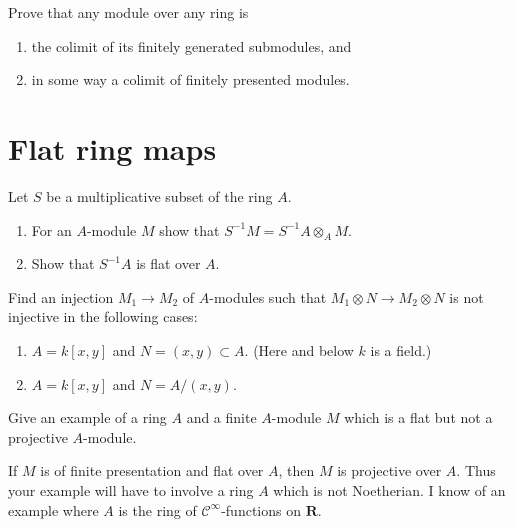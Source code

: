 \begin{exercise}
\label{exercise-colimit-modules}
Prove that any module over any ring is
\begin{enumerate}
\item the colimit of its finitely generated submodules, and
\item in some way a colimit of finitely presented modules.
\end{enumerate}
\end{exercise}








\section{Flat ring maps}
\label{section-flat}

\begin{exercise}
\label{exercise-localization-flat}
Let $S$ be a multiplicative subset of the ring $A$.
\begin{enumerate}
\item For an $A$-module $M$ show that $S^{-1}M = S^{-1}A\otimes_A M$.
\item Show that $S^{-1}A$ is flat over $A$.
\end{enumerate}
\end{exercise}

\begin{exercise}
\label{exercise-examples-not-flat}
Find an injection $M_1 \to M_2$ of $A$-modules such that
$M_1\otimes N \to M_2 \otimes N$ is not injective in the following
cases:
\begin{enumerate}
\item $A = k[x, y]$ and $N = (x, y) \subset A$. (Here and below $k$ is a field.)
\item $A = k[x, y]$ and $N = A/(x, y)$.
\end{enumerate}
\end{exercise}

\begin{exercise}
\label{exercise-flat-not-projective}
Give an example of a ring $A$ and a finite $A$-module $M$
which is a flat but not a projective $A$-module.
\end{exercise}

\begin{remark}
\label{remark-flat-not-projective}
If $M$ is of finite presentation and flat over $A$,
then $M$ is projective over $A$. Thus your example will have to
involve a ring $A$ which is not Noetherian. I know of an example
where $A$ is the ring of ${\mathcal C}^\infty$-functions on ${\mathbf R}$.
\end{remark}

